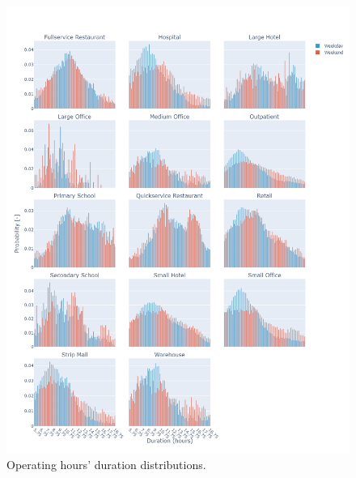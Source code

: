 \begin{figure}
    \centering \includegraphics[width=1\textwidth]{figures/duration.png}
    \caption{Operating hours' duration distributions.}
    \label{fig:duration}
\end{figure}

